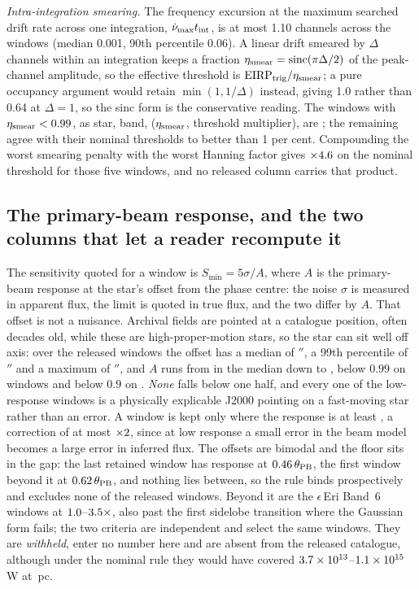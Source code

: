 \emph{Intra-integration smearing.} The frequency excursion at the maximum
searched drift rate across one integration, $\dot\nu_{\max} t_{\rm int}$, is
at most 1.10 channels across the \NWindows{} windows (median 0.001, 90th
percentile 0.06). A linear drift smeared by $\Delta$ channels within an
integration keeps a fraction
$\eta_{\rm smear} = \mathrm{sinc}(\pi\Delta/2)$ of the peak-channel
amplitude, so the effective threshold is
$\mathrm{EIRP}_{\rm trig}/\eta_{\rm smear}$; a pure occupancy argument would
retain $\min(1,1/\Delta)$ instead, giving 1.0 rather than 0.64 at
$\Delta=1$, so the sinc form is the conservative reading. The \NSmearLo{}
windows with $\eta_{\rm smear}<0.99$, as star, band,
($\eta_{\rm smear}$, threshold multiplier), are \SmearList; the remaining
\NSmearOk{} agree with their nominal thresholds to better than 1 per cent.
Compounding the worst smearing penalty with the worst Hanning factor gives
$\times4.6$ on the nominal threshold for those five windows, and
no released column carries that product.

\subsection{The primary-beam response, and the two columns that let a reader
recompute it}

The sensitivity quoted for a window is $S_{\min}=5\sigma/A$, where $A$ is the
primary-beam response at the star's offset from the phase centre: the noise
$\sigma$ is measured in apparent flux, the limit is quoted in true flux, and
the two differ by $A$. That offset is not a nuisance. Archival fields are
pointed at a catalogue position, often decades old, while these are
high-proper-motion stars, so the star can sit well off axis: over the
\PbNWin{} released windows the offset has a median of \PbOffMed$''$, a 99th
percentile of \PbOffPNN$''$ and a maximum of \PbOffMax$''$, and $A$ runs from
\PbAMed{} in the median down to \PbAMin, below $0.99$ on \PbNLowNN{} windows
and below $0.9$ on \PbNLowN. \emph{None} falls below one half, and every one
of the low-response windows is a physically explicable J2000 pointing on a
fast-moving star rather than an error. A window is kept only where the
response is at least \PbFloorResp, a correction of at most
$\times2$, since at low response a small error in the beam model
becomes a large error in inferred flux. The offsets are bimodal and the floor
sits in the gap: the last retained window has response \PbGapKeptResp{} at
$0.46\,\theta_{\rm PB}$, the first window beyond it \PbGapHeldResp{}
at $0.62\,\theta_{\rm PB}$, and nothing lies between, so the rule
binds prospectively and excludes none of the \NWindows{} released windows.
Beyond it are the \EpsEriNWin{} $\epsilon$\,Eri Band~6 windows at
$1.0$--$3.5\times$, also past the first sidelobe transition
where the Gaussian form fails; the two criteria are independent and select
the same windows. They are \emph{withheld}, enter no number here and are
absent from the released catalogue, although under the nominal rule they
would have covered $3.7\times10^{13}$--$1.1\times10^{15}$\,W at \EpsEriDistPc\,pc.

